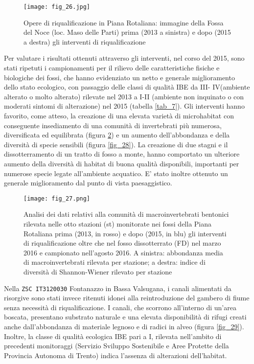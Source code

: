 \documentclass[11pt,a4paper,italian,twoside,openany]{memoir}
\begin{document}
\begin{figure}[H]
  \centering
  \texttt{[image: fig\_26.jpg]}
  \caption{Opere di riqualificazione in Piana Rotaliana: immagine della Fossa del Noce (loc. Maso delle Parti) prima (2013 a sinistra) e dopo (2015 a destra) gli interventi di riqualificazione}
  \label{fig_26}
\end{figure}

Per valutare i risultati ottenuti attraverso gli interventi, nel corso del 2015, sono stati ripetuti i campionamenti per il rilievo delle caratteristiche fisiche e biologiche dei fossi, che hanno evidenziato un netto e generale miglioramento dello stato ecologico, con passaggio delle classi di qualità IBE da III- IV(ambiente alterato o molto alterato) rilevate nel 2013 a I-II (ambiente non inquinato o con moderati sintomi di alterazione) nel 2015 (tabella \ref{tab_7}). Gli interventi hanno favorito, come atteso, la creazione di una elevata varietà di microhabitat con conseguente insediamento di una comunità di invertebrati più numerosa, diversificata ed equilibrata (figura \ref{fig_27}) e un aumento dell'abbondanza e della diversità di specie sensibili (figura \ref{fig_28}). La creazione di due stagni e il dissotterramento di un tratto di fosso a monte, hanno comportato un ulteriore aumento della diversità di habitat di buona qualità disponibili, importanti per numerose specie legate all'ambiente acquatico. E' stato inoltre ottenuto un generale miglioramento dal punto di vista paesaggistico. 

\begin{figure}
  \centering
  \texttt{[image: fig\_27.png]}
  \caption{Analisi dei dati relativi alla comunità di macroinvertebrati bentonici rilevata nelle otto stazioni (st) monitorate nei fossi della Piana Rotaliana prima (2013, in rosso) e dopo (2015, in blu) gli interventi di riqualificazione oltre che nel fosso dissotterrato (FD) nel marzo 2016 e campionato nell'agosto 2016. A sinistra: abbondanza media di macroinvertebrati rilevata per stazione; a destra: indice di diversità di Shannon-Wiener rilevato per stazione}
  \label{fig_27}
\end{figure} 

Nella \texttt{ZSC IT3120030} Fontanazzo in Bassa Valsugana, i canali alimentati da risorgive sono stati invece ritenuti idonei alla reintroduzione del gambero di fiume senza necessità di riqualificazione. I canali, che scorrono all'interno di un'area boscata, presentano substrato naturale e una elevata disponibilità di rifugi creati anche dall'abbondanza di materiale legnoso e di radici in alveo (figura \ref{fig_29}). Inoltre, la classe di qualità ecologica IBE pari a I, rilevata nell'ambito di precedenti monitoraggi (Servizio Sviluppo Sostenibile e Aree Protette della Provincia Autonoma di Trento) indica l'assenza di alterazioni dell'habitat. 
\end{document}
